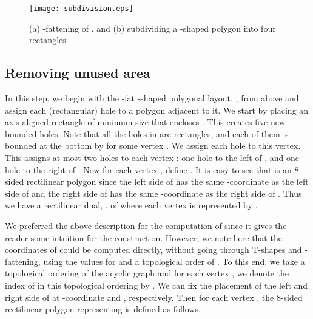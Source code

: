 \documentclass[11pt]{article}
\begin{document}
\begin{figure}[htbp]
\centering
\texttt{[image: subdivision.eps]}
\caption{\small\sf (a) -fattening of , and (b) subdividing a -shaped polygon into four rectangles.}
\label{fig:subdivision}
\end{figure}



\subsection{Removing unused area}

In this step, we begin with the -fat -shaped polygonal
layout, , from above and
assign each
(rectangular) hole to a polygon adjacent to it. We start by placing an axis-aligned
 rectangle of minimum size that encloses . This creates five new bounded holes.
Note that all the holes in  are rectangles, and
each of them is bounded at the bottom by  for some vertex .
We assign each hole to this vertex.  This assigns at most two holes
to each vertex : one hole  to the left of , and one
hole  to the right of .
Now for each
vertex , define . It is easy to see
 that  is an 8-sided rectilinear polygon since the left side of  has the same -coordinate as the left side
 of  and the right side of  has the same -coordinate as
 the right side of . Thus we have a rectilinear dual, ,
 of  where each vertex  is represented by .


We preferred the above description for the computation of  since it gives the reader some intuition for
 the construction. However, we note here that the coordinates of  could be computed directly, without going
 through T-shapes and -fattening, using the values  for  and a topological order
  of . To this end, we take a topological ordering of the acyclic
 graph  and for each vertex , we denote the index of  in
 this topological ordering by . We can fix the placement of the left and right side of  at
 -coordinate  and , respectively. Then for each vertex ,
 the 8-sided rectilinear polygon  representing  is defined as follows.
\end{document}
